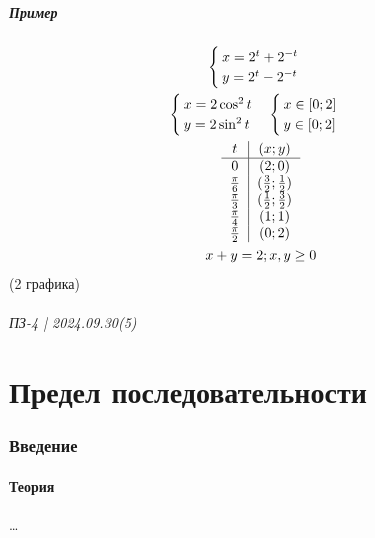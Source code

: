 \documentclass{article}
\begin{document}
\subsubsection{Пример}
\begin{gather*}
    \begin{cases}
        x = 2^t + 2^{-t} \\
        y = 2^t - 2^{-t}
    \end{cases} \\
    \begin{cases}
        x = 2 \cos^2 t \\
        y = 2 \sin^2 t
    \end{cases}
    \begin{cases}
        x \in [0;2] \\
        y \in [0;2]
    \end{cases} \\
    \begin{tabular}{c|c}
        $t$             & $(x;y)$                     \\
        \hline
        $0$             & $(2;0)$                     \\
        $\frac{\pi}{6}$ & $(\frac{3}{2};\frac{1}{2})$ \\
        $\frac{\pi}{3}$ & $(\frac{1}{2};\frac{3}{2})$ \\
        $\frac{\pi}{4}$ & $(1;1)$                     \\
        $\frac{\pi}{2}$ & $(0;2)$
    \end{tabular} \\
    x + y = 2; x, y \ge 0
\end{gather*}
(2 графика)




\newpage
\paragraph{ПЗ-4 | 2024.09.30(5)}
\part{Предел последовательности}

\section{Введение}

\subsection{Теория}
\dots
\end{document}
